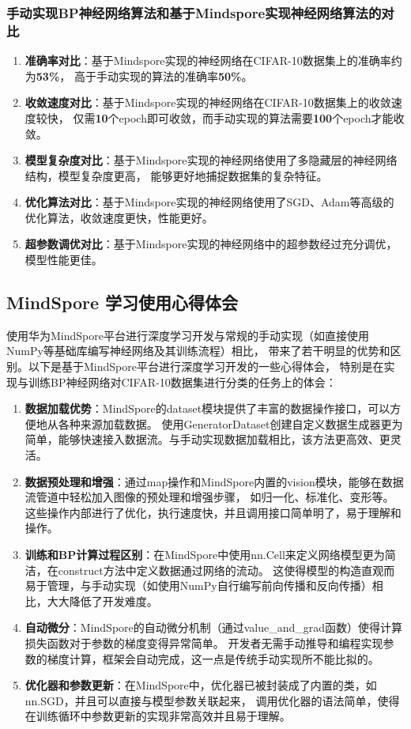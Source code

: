 \documentclass[12pt]{article}
\begin{document}
\subsubsection{手动实现BP神经网络算法和基于Mindspore实现神经网络算法的对比}
\begin{enumerate}
  \item \textbf{准确率对比}：基于Mindspore实现的神经网络在CIFAR-10数据集上的准确率约为\textbf{53\%}，
        高于手动实现的算法的准确率\textbf{50\%}。
  \item \textbf{收敛速度对比}：基于Mindspore实现的神经网络在CIFAR-10数据集上的收敛速度较快，
        仅需\textbf{10}个epoch即可收敛，而手动实现的算法需要\textbf{100}个epoch才能收敛。
  \item \textbf{模型复杂度对比}：基于Mindspore实现的神经网络使用了多隐藏层的神经网络结构，模型复杂度更高，
        能够更好地捕捉数据集的复杂特征。
  \item \textbf{优化算法对比}：基于Mindspore实现的神经网络使用了SGD、Adam等高级的优化算法，收敛速度更快，性能更好。
  \item \textbf{超参数调优对比}：基于Mindspore实现的神经网络中的超参数经过充分调优，模型性能更佳。
\end{enumerate}


\subsection{MindSpore 学习使用心得体会}
使用华为MindSpore平台进行深度学习开发与常规的手动实现（如直接使用NumPy等基础库编写神经网络及其训练流程）相比，
带来了若干明显的优势和区别。以下是基于MindSpore平台进行深度学习开发的一些心得体会，
特别是在实现与训练BP神经网络对CIFAR-10数据集进行分类的任务上的体会：
\begin{enumerate}
  \item \textbf{数据加载优势}：MindSpore的dataset模块提供了丰富的数据操作接口，可以方便地从各种来源加载数据。
        使用GeneratorDataset创建自定义数据生成器更为简单，能够快速接入数据流。与手动实现数据加载相比，该方法更高效、更灵活。
  \item \textbf{数据预处理和增强}：通过map操作和MindSpore内置的vision模块，能够在数据流管道中轻松加入图像的预处理和增强步骤，
        如归一化、标准化、变形等。这些操作内部进行了优化，执行速度快，并且调用接口简单明了，易于理解和操作。
  \item \textbf{训练和BP计算过程区别}：在MindSpore中使用nn.Cell来定义网络模型更为简洁，在construct方法中定义数据通过网络的流动。
        这使得模型的构造直观而易于管理，与手动实现（如使用NumPy自行编写前向传播和反向传播）相比，大大降低了开发难度。
  \item \textbf{自动微分}：MindSpore的自动微分机制（通过value\_and\_grad函数）使得计算损失函数对于参数的梯度变得异常简单。
        开发者无需手动推导和编程实现参数的梯度计算，框架会自动完成，这一点是传统手动实现所不能比拟的。
  \item \textbf{优化器和参数更新}：在MindSpore中，优化器已被封装成了内置的类，如nn.SGD，并且可以直接与模型参数关联起来，
        调用优化器的语法简单，使得在训练循环中参数更新的实现非常高效并且易于理解。

\end{enumerate}
\end{document}

